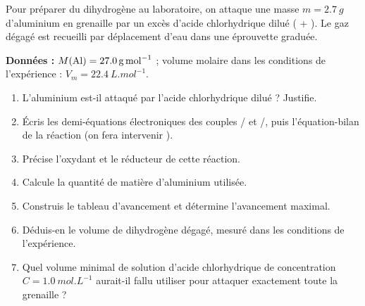 \documentclass[11pt]{article}
\begin{document}
\begin{exercice}
Pour préparer du dihydrogène au laboratoire, on attaque une masse $m = \SI{2,7}{g}$ d'aluminium en grenaille par un excès d'acide chlorhydrique dilué ( + ). Le gaz dégagé est recueilli par déplacement d'eau dans une éprouvette graduée.

\textbf{Données :} $M(\ce{Al}) = \SI{27,0}{g.mol^{-1}}$ ; volume molaire dans les conditions de l'expérience : $V_m = \SI{22,4}{L.mol^{-1}}$.

\begin{enumerate}
\item L'aluminium est-il attaqué par l'acide chlorhydrique dilué ? Justifie.
\item Écris les demi-équations électroniques des couples / et /, puis l'équation-bilan de la réaction (on fera intervenir ).
\item Précise l'oxydant et le réducteur de cette réaction.
\item Calcule la quantité de matière d'aluminium utilisée.
\item Construis le tableau d'avancement et détermine l'avancement maximal.
\item Déduis-en le volume de dihydrogène dégagé, mesuré dans les conditions de l'expérience.
\item Quel volume minimal de solution d'acide chlorhydrique de concentration $C = \SI{1,0}{mol.L^{-1}}$ aurait-il fallu utiliser pour attaquer exactement toute la grenaille ?
\end{enumerate}
\end{exercice}
\end{document}
